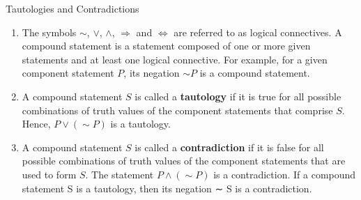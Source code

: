 \documentclass{beamer}
\begin{document}
\begin{frame}{Tautologies and Contradictions}
    \begin{enumerate}
        \item The symbols $\sim$, $\lor$, $\land$, $\Rightarrow$ and $\Leftrightarrow$ are referred to as logical connectives. A compound statement is a statement composed of one or more given statements and at least one logical connective. For example, for a given component statement $P$, its negation $\sim P$ is a compound statement.
        \item A compound statement $S$ is called a \textbf{tautology} if it is true for all possible combinations of truth values of the component statements that comprise $S$. Hence, $P \lor (\sim P)$ is a tautology.
        \item A compound statement $S$ is called a \textbf{contradiction} if it is false for all possible combinations of truth values of the component statements that are used to form $S$. The statement $P \land (\sim P)$ is a contradiction. If a compound statement S is a tautology, then its negation ∼ S is a
contradiction.
    \end{enumerate}

\end{frame}
\end{document}
